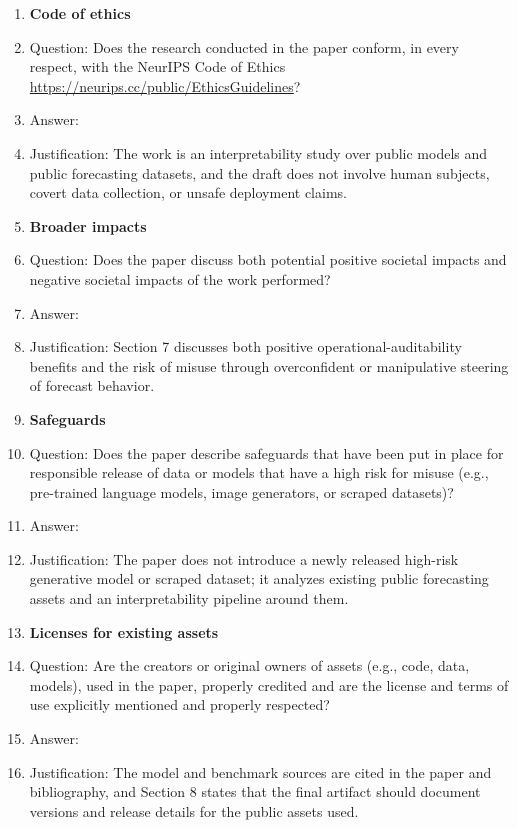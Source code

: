 \begin{enumerate}
\item {\bf Code of ethics}
    \item[] Question: Does the research conducted in the paper conform, in every respect, with the NeurIPS Code of Ethics \url{https://neurips.cc/public/EthicsGuidelines}?
    \item[] Answer: \answerYes{}
    \item[] Justification: The work is an interpretability study over public models and public forecasting datasets, and the draft does not involve human subjects, covert data collection, or unsafe deployment claims.

\item {\bf Broader impacts}
    \item[] Question: Does the paper discuss both potential positive societal impacts and negative societal impacts of the work performed?
    \item[] Answer: \answerYes{}
    \item[] Justification: Section 7 discusses both positive operational-auditability benefits and the risk of misuse through overconfident or manipulative steering of forecast behavior.
    
\item {\bf Safeguards}
    \item[] Question: Does the paper describe safeguards that have been put in place for responsible release of data or models that have a high risk for misuse (e.g., pre-trained language models, image generators, or scraped datasets)?
    \item[] Answer: \answerNA{}
    \item[] Justification: The paper does not introduce a newly released high-risk generative model or scraped dataset; it analyzes existing public forecasting assets and an interpretability pipeline around them.

\item {\bf Licenses for existing assets}
    \item[] Question: Are the creators or original owners of assets (e.g., code, data, models), used in the paper, properly credited and are the license and terms of use explicitly mentioned and properly respected?
    \item[] Answer: \answerYes{}
    \item[] Justification: The model and benchmark sources are cited in the paper and bibliography, and Section 8 states that the final artifact should document versions and release details for the public assets used.


\end{enumerate}
